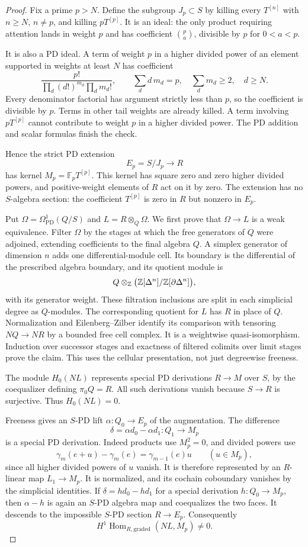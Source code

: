 \begin{proof}
Fix a prime $p>N$. Define the subgroup $J_p\subset S$
by killing every $T^{[n]}$ with $n\geq N$, $n\ne p$,
and killing $pT^{[p]}$. It is an ideal: the only
product requiring attention lands in weight $p$ and
has coefficient $\binom pa$, divisible by $p$ for
$0<a<p$.

It is also a PD ideal. A term of weight $p$ in a
higher divided power of an element supported in
weights at least $N$ has coefficient
\[
 \frac{p!}
 {\prod_d(d!)^{m_d}\prod_d m_d!},
 \qquad
 \sum_d d\,m_d=p,\quad \sum_d m_d\geq2,\quad d\geq N.
\]
Every denominator factorial has argument strictly
less than $p$, so the coefficient is divisible by
$p$. Terms in other tail weights are already killed.
A term involving $pT^{[p]}$ cannot contribute to
weight $p$ in a higher divided power. The PD addition
and scalar formulas finish the check.

Hence the strict PD extension
\[
 E_p=S/J_p\longrightarrow R
\]
has kernel $M_p=\mathbb F_pT^{[p]}$. This kernel has
square zero and zero higher divided powers, and
positive-weight elements of $R$ act on it by zero.
The extension has no $S$-algebra section: the
coefficient $T^{[p]}$ is zero in $R$ but nonzero
in $E_p$.

Put $\Omega=\Omega^1_{\mathrm{PD}}(Q/S)$ and
$L=R\otimes_Q\Omega$. We first prove that
$\Omega\to L$ is a weak equivalence. Filter $\Omega$
by the stages at which the free generators of $Q$
were adjoined, extending coefficients to the final
algebra $Q$. A simplex generator of dimension $n$
adds one differential-module cell. Its boundary is
the differential of the prescribed algebra boundary,
and its quotient module is
\[
 Q\otimes_{\mathbb Z}
 \bigl(\mathbb Z[\Delta^n]/\mathbb Z[\partial\Delta^n]\bigr),
\]
with its generator weight. These filtration
inclusions are split in each simplicial degree as
$Q$-modules. The corresponding quotient for $L$
has $R$ in place of $Q$. Normalization and
Eilenberg--Zilber identify its comparison with
tensoring $NQ\to NR$ by a bounded free cell complex.
It is a weightwise quasi-isomorphism. Induction over
successor stages and exactness of filtered colimits
over limit stages prove the claim. This uses the
cellular presentation, not just degreewise freeness.

The module $H_0(NL)$ represents special PD
derivations $R\to M$ over $S$, by the coequalizer
defining $\pi_0Q=R$. All such derivations vanish
because $S\to R$ is surjective. Thus $H_0(NL)=0$.

Freeness gives an $S$-PD lift
$\alpha:Q_0\to E_p$ of the augmentation. The
difference
\[
 \delta=\alpha d_0-\alpha d_1:Q_1\longrightarrow M_p
\]
is a special PD derivation. Indeed products use
$M_p^2=0$, and divided powers use
\[
 \gamma_m(e+u)-\gamma_m(e)
 =\gamma_{m-1}(e)u\qquad(u\in M_p),
\]
since all higher divided powers of $u$ vanish.
It is therefore represented by an $R$-linear map
$L_1\to M_p$. It is normalized, and its cochain
coboundary vanishes by the simplicial identities.
If $\delta=h d_0-h d_1$ for a special derivation
$h:Q_0\to M_p$, then $\alpha-h$ is again an
$S$-PD algebra map and coequalizes the two faces.
It descends to the impossible $S$-PD section
$R\to E_p$. Consequently
\[
 H^1\operatorname{Hom}_{R,\mathrm{graded}}(NL,M_p)
 \ne0.
\]


\end{proof}
